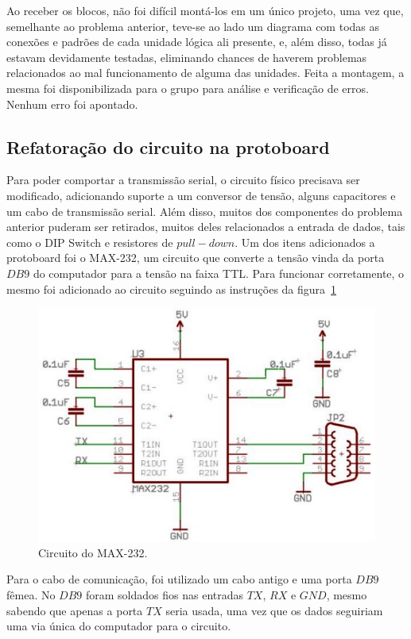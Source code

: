 \documentclass[12pt]{article}
\begin{document}
Ao receber os blocos, não foi difícil montá-los em um único projeto, uma vez que, semelhante ao problema anterior, teve-se ao lado um diagrama com todas as conexões e padrões de cada unidade lógica ali presente, e, além disso, todas já estavam devidamente testadas, eliminando chances de haverem problemas relacionados ao mal funcionamento de alguma das unidades. Feita a montagem, a mesma foi disponibilizada para o grupo para análise e verificação de erros. Nenhum erro foi apontado.

\subsection{Refatoração do circuito na protoboard}

Para poder comportar a transmissão serial, o circuito físico precisava ser modificado, adicionando suporte a um conversor de tensão, alguns capacitores e um cabo de transmissão serial. Além disso, muitos dos componentes do problema anterior puderam ser retirados, muitos deles relacionados a entrada de dados, tais como o DIP Switch e resistores de $pull-down$. Um dos itens adicionados a protoboard foi o MAX-232, um circuito que converte a tensão vinda da porta $DB9$ do computador para a tensão na faixa TTL. Para funcionar corretamente, o mesmo foi adicionado ao circuito seguindo as instruções da figura~\ref{fig:max232}

\begin{figure}[!htbp]
\centering
\includegraphics[width=.8\textwidth]{img/p4/232.jpg}
\caption{Circuito do MAX-232.}
\label{fig:max232}
\end{figure}

Para o cabo de comunicação, foi utilizado um cabo antigo e uma porta $DB9$ fêmea. No $DB9$ foram soldados fios nas entradas $TX$, $RX$ e $GND$, mesmo sabendo que apenas a porta $TX$ seria usada, uma vez que os dados seguiriam uma via única do computador para o circuito.
\end{document}
